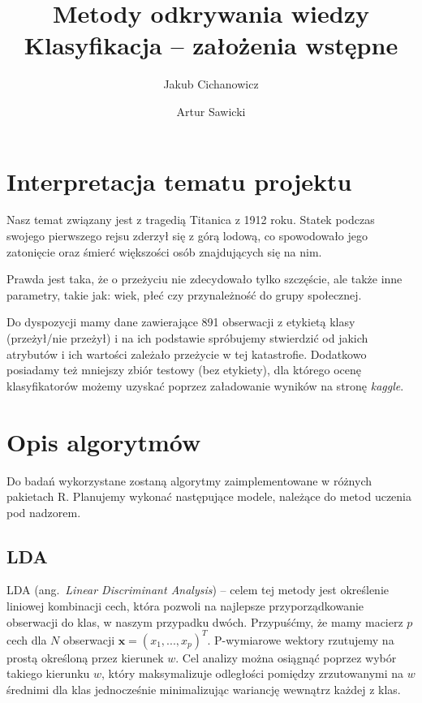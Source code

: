 \documentclass{article}
\newcommand{\ang}[1]{ang.~{\itshape #1}}
\begin{document}
\title{Metody odkrywania wiedzy \\%
{\large Klasyfikacja -- założenia wstępne} }

\author{Jakub Cichanowicz \and Artur Sawicki}

\maketitle

\section{Interpretacja tematu projektu}
Nasz temat związany jest z tragedią Titanica z 1912 roku. Statek podczas swojego pierwszego rejsu zderzył się z górą lodową, co spowodowało jego zatonięcie oraz śmierć większości osób znajdujących się na nim.

Prawda jest taka, że o przeżyciu nie zdecydowało tylko szczęście, ale także inne parametry, takie jak: wiek, płeć czy przynależność do grupy społecznej.

Do dyspozycji mamy dane zawierające 891 obserwacji z etykietą klasy (przeżył/nie przeżył) i na ich podstawie spróbujemy stwierdzić od jakich atrybutów i ich wartości zależało przeżycie w tej katastrofie. Dodatkowo posiadamy też mniejszy zbiór testowy (bez etykiety), dla którego ocenę klasyfikatorów możemy uzyskać poprzez załadowanie wyników na stronę {\itshape kaggle}.

\section{Opis algorytmów}
Do badań wykorzystane zostaną algorytmy zaimplementowane w różnych pakietach R. Planujemy wykonać następujące modele, należące do metod uczenia pod nadzorem.

\subsection{LDA}
LDA (\ang{Linear Discriminant Analysis}) -- celem tej metody jest określenie liniowej kombinacji cech, która pozwoli na najlepsze przyporządkowanie obserwacji do klas, w naszym przypadku dwóch. Przypuśćmy, że mamy macierz $p$ cech dla $N$ obserwacji $\mathbf{x}=(x_{1},...,x_{p})^{T}$. P-wymiarowe wektory rzutujemy na prostą określoną przez kierunek $w$. Cel analizy można osiągnąć poprzez wybór takiego kierunku $w$, który maksymalizuje odległości pomiędzy zrzutowanymi na $w$ średnimi dla klas jednocześnie minimalizując wariancję wewnątrz każdej z klas.
\end{document}
